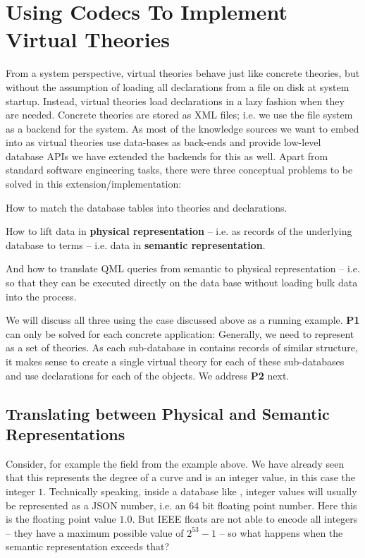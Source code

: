 \section{Using Codecs To Implement \lmfdb Virtual Theories}\label{sec:vt}

From a system perspective, virtual theories behave just like concrete theories, but
without the assumption of loading all declarations from a file on disk at system startup.
Instead, virtual theories load declarations in a lazy fashion when they are
needed. Concrete theories are stored as XML files; i.e. we use the file system as a
backend for the \mmt system. As most of the knowledge sources we want to embed into \ommt
as virtual theories use data-bases as back-ends and provide low-level database APIs we
have extended the \mmt backends for this as well. Apart from standard software engineering
tasks, there were three conceptual problems to be solved in this extension/implementation:
\begin{compactenum}[\bf P1]
\item How to match the database tables into \ommt theories and declarations. 
\item How to lift data in \textbf{physical representation} -- i.e. as records of the
  underlying database to \ommt terms -- i.e. data in \textbf{semantic representation}.
\item And how to translate QML queries from semantic to physical representation -- i.e. so
  that they can be executed directly on the data base without loading bulk data into the
  \mmt process.
\end{compactenum}
We will discuss all three using the \lmfdb case discussed above as a running
example. \textbf{P1} can only be solved for each concrete application: Generally, we need
to represent \lmfdb as a set of \ommt theories.  As each sub-database in \lmfdb contains
records of similar structure, it makes sense to create a single virtual theory for each of
these sub-databases and use \ommt declarations for each of the objects. We address
\textbf{P2} next.

\subsection{Translating between Physical and Semantic Representations}\label{sec:vt:translation}

Consider, for example the  field from the example above. 
We have already seen that this represents the degree of a curve and is an integer value, in this case the integer $1$. 
Technically speaking, inside a database like \lmfdb, integer values will usually be represented as a JSON number, i.e. an  $64$ bit floating point number. 
Here this is the floating point value $1.0$. 
But IEEE floats are not able to encode all integers -- they have a maximum possible value of $2^{53}-1$ -- so what happens when the semantic representation exceeds that?

